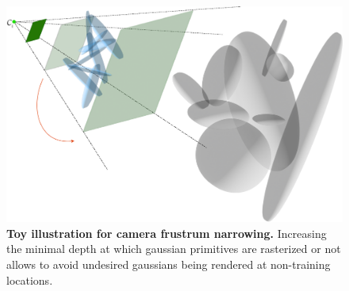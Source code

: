 \begin{figure}[htb!]
  \center
\includegraphics[width=.7\linewidth]{images/gaussiansplatting/gaussian-floaters.png}
\caption{\textbf{Toy illustration for camera frustrum narrowing.} Increasing the minimal depth at which gaussian primitives are rasterized or not allows to avoid undesired gaussians being rendered at non-training locations.}
\label{fig:floater-limitation}
\end{figure}

